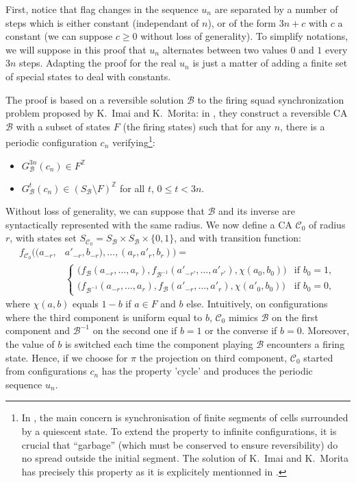 \documentclass[a4paper]{elsarticle}
\newcommand{\ZZ}{\mathbb{Z}}
\newcommand{\ACB}{\mathcal{B}}
\newcommand{\ACC}{\mathcal{C}}
\newcommand{\locB}{f_{\ACB}}
\newcommand\local[1]{f_{#1}}
\newcommand{\globB}{G_{\ACB}}
\newcommand\alphabe[1]{S_{#1}}
\newcommand{\alphB}{\alphabe{\ACB}}
\newcommand\flagseq[1]{u_{#1}}
\begin{document}
\begin{pf}
  First, notice that flag changes in the sequence $\flagseq{n}$ are
  separated by a number of steps which is either constant (independant
  of $n$), or of the form ${3n+c}$ with $c$ a constant (we can suppose
  ${c\geq 0}$ without loss of generality). To simplify notations, we
  will suppose in this proof that $\flagseq{n}$ alternates between two
  values $0$ and $1$ every ${3n}$ steps. Adapting the proof for the
  real $\flagseq{n}$ is just a matter of adding a finite set of
  special states to deal with constants.
  
  The proof is based on a reversible solution $\ACB$ to the firing
  squad synchronization problem proposed by K.~Imai and K.~Morita: in
  \cite{ImaMor96}, they construct a reversible CA $\ACB$ with a
  subset of states $F$ (the firing states) such that for any $n$,
  there is a periodic configuration $c_n$ verifying\footnote{In
    \cite{ImaMor96}, the main concern is synchronisation of finite
    segments of cells surrounded by a quiescent state. To extend the
    property to infinite configurations, it is crucial that
    ``garbage'' (which must be conserved to ensure reversibility) do
    no spread outside the initial segment. The solution of K.~Imai and
    K.~Morita has precisely this property as it is explicitely
    mentionned in \cite{ImaMor96}.}:
  \begin{itemize}
  \item ${\globB^{3n}(c_n)\in F^\ZZ}$
  \item ${\globB^t(c_n)\in (\alphB\setminus F)^\ZZ}$ for all $t$,
    ${0\leq t<3n}$.
  \end{itemize}
  
  Without loss of generality, we can suppose that $\ACB$ and its
  inverse are syntactically represented with the same radius.  We now
  define a CA $\ACC_0$ of radius $r$, with states set
  ${\alphabe{\ACC_0}=\alphB\times \alphB\times\{0,1\}}$, and with
  transition function:
  \begin{align*}
    \local{\ACC_0}\bigl((a_{-r}, & a'_{-r},b_{-r}),\ldots,
    (a_{r},a'_{r},b_{r})\bigr) =\\
    &\begin{cases}
      \bigl(\locB(a_{-r},\ldots,a_{r}),\local{\ACB^{-1}}(a'_{-r'},
      \ldots,a'_{r'}),\chi(a_0,b_0)\bigr)
      &\text{if }b_0=1,\\
      \bigl(\local{\ACB^{-1}}(a_{-r},\ldots,a_{r}),\locB(a'_{-r},
      \ldots,a'_{r}),\chi(a'_0,b_0)\bigr) &\text{if }b_0=0,
    \end{cases}
  \end{align*}
  where ${\chi(a,b)}$ equals ${1-b}$ if ${a\in F}$ and $b$ else. Intuitively, on
  configurations where the third component is uniform equal to $b$, $\ACC_0$
  mimics $\ACB$ on the first component and $\ACB^{-1}$ on the second one if
  ${b=1}$ or the converse if ${b=0}$. Moreover, the value of $b$ is switched
  each time the component playing $\ACB$ encounters a firing state. Hence, if we
  choose for $\pi$ the projection on third component, $\ACC_0$ started from
  configurations $c_n$ has the property 'cycle' and produces the periodic
  sequence $\flagseq{n}$.


\end{pf}
\end{document}
